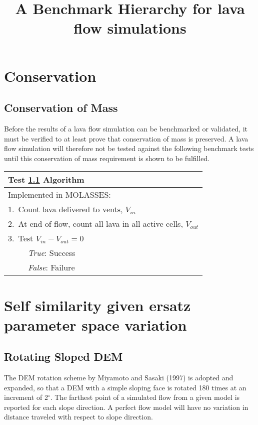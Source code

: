 \documentclass[12pt,letter]{article}
\title{A Benchmark Hierarchy for lava flow simulations}
\date{}
\author{}
\newcommand{\tabitem}{~~\llap{\textbullet}~~}
\begin{document}
\maketitle

\section{Conservation}
\subsection{Conservation of Mass}\label{test:CoM}
	Before the results of a lava flow simulation can be benchmarked or validated, it must be verified to at least prove that conservation of mass is preserved. A lava flow simulation will therefore not be tested against the following benchmark tests until this conservation of mass requirement is shown to be fulfilled.

\begin{center}
	\begin{tabular}{l}
		\toprule
		\textbf{Test \ref{test:CoM} Algorithm}\\
		\midrule
		Implemented in MOLASSES:\\
		1.~Count lava delivered to vents, $V_{in}$\\
		2.~At end of flow, count all lava in all active cells, $V_{out}$\\
		3.~Test $V_{in}-V_{out}=0$\\
		~\tabitem \textit{True}: Success\\
		~\tabitem \textit{False}: Failure
		\bottomrule
	\end{tabular}
\end{center}

\section{Self similarity given ersatz parameter space variation}
\subsection{Rotating Sloped DEM}\label{test:SS_rotate}
The DEM rotation scheme by Miyamoto and Sasaki (1997) is adopted and expanded, so that a DEM with a simple sloping face is rotated 180 times at an increment of 2$^{\circ}$. The farthest point of a simulated flow from a given model is reported for each slope direction. A perfect flow model will have no variation in distance traveled with respect to slope direction.
\end{document}
